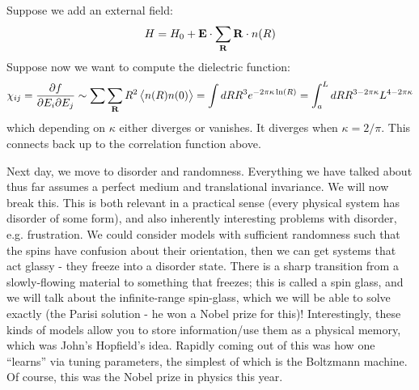 Suppose we add an external field:
\begin{equation}
    H = H_0 + \mathbf{E} \cdot \sum_{\mathbf{R}} \mathbf{R} \cdot n(R)
\end{equation}
Suppose now we want to compute the dielectric function:
\begin{equation}
    \chi_{ij} = \frac{\partial f}{\partial E_i \partial E_j} \sim \sum \sum_{\mathbf{R}}R^2\left< n(R)n(0) \right> = \int dR R^3 e^{-2\pi\kappa \ln(R)} = \int_a^L dR R^{3-2\pi\kappa} L^{4-2\pi\kappa}
\end{equation}
which depending on $\kappa$ either diverges or vanishes. It diverges when $\kappa = 2/\pi$. This connects back up to the correlation function above.

Next day, we move to disorder and randomness. Everything we have talked about thus far assumes a perfect medium and translational invariance. We will now break this. This is both relevant in a practical sense (every physical system has disorder of some form), and also inherently interesting problems with disorder, e.g. frustration. We could consider models with sufficient randomness such that the spins have confusion about their orientation, then we can get systems that act glassy - they freeze into a disorder state. There is a sharp transition from a slowly-flowing material to something that freezes; this is called a spin glass, and we will talk about the infinite-range spin-glass, which we will be able to solve exactly (the Parisi solution - he won a Nobel prize for this)! Interestingly, these kinds of models allow you to store information/use them as a physical memory, which was John's Hopfield's idea. Rapidly coming out of this was how one ``learns'' via tuning parameters, the simplest of which is the Boltzmann machine. Of course, this was the Nobel prize in physics this year.